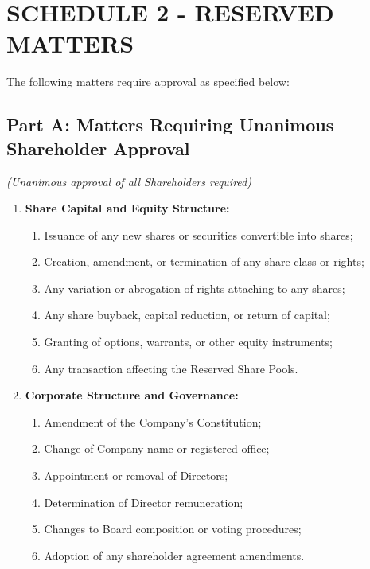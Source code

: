 \section*{SCHEDULE 2 - RESERVED MATTERS}

The following matters require approval as specified below:

\subsection*{Part A: Matters Requiring Unanimous Shareholder Approval}
\textit{(Unanimous approval of all Shareholders required)}

\begin{enumerate}[label=\arabic*.]
    \item \textbf{Share Capital and Equity Structure:}
        \begin{enumerate}[label=(\alph*)]
            \item Issuance of any new shares or securities convertible into shares;
            \item Creation, amendment, or termination of any share class or rights;
            \item Any variation or abrogation of rights attaching to any shares;
            \item Any share buyback, capital reduction, or return of capital;
            \item Granting of options, warrants, or other equity instruments;
            \item Any transaction affecting the Reserved Share Pools.
        \end{enumerate}

    \item \textbf{Corporate Structure and Governance:}
        \begin{enumerate}[label=(\alph*)]
            \item Amendment of the Company's Constitution;
            \item Change of Company name or registered office;
            \item Appointment or removal of Directors;
            \item Determination of Director remuneration;
            \item Changes to Board composition or voting procedures;
            \item Adoption of any shareholder agreement amendments.
        \end{enumerate}


\end{enumerate}
